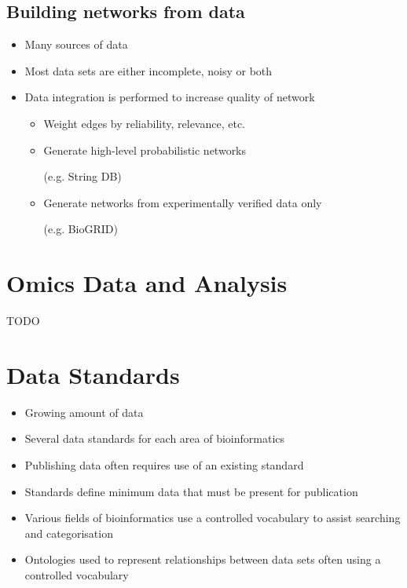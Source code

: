 \documentclass[a4paper]{article}
\begin{document}
\subsection{Building networks from data}

\begin{itemize}
  \item
    Many sources of data

  \item
    Most data sets are either incomplete, noisy or both

  \item
    Data integration is performed to increase quality of network

    \begin{itemize}
      \item
        Weight edges by reliability, relevance, etc.

      \item
        Generate high-level probabilistic networks

        (e.g. String DB)

      \item
        Generate networks from experimentally verified data only

        (e.g. BioGRID)
    \end{itemize}
\end{itemize}

\section{Omics Data and Analysis}

TODO

\section{Data Standards}

\begin{itemize}
  \item
    Growing amount of data

  \item
    Several data standards for each area of bioinformatics

  \item
    Publishing data often requires use of an existing standard

  \item
    Standards define minimum data that must be present for publication

  \item
    Various fields of bioinformatics use a controlled vocabulary to assist
    searching and categorisation

  \item
    Ontologies used to represent relationships between data sets often using a
    controlled vocabulary
\end{itemize}
\end{document}
